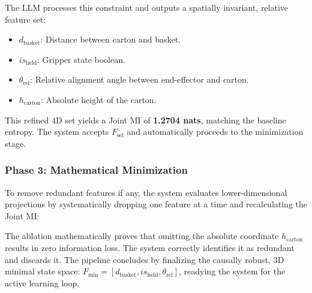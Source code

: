 \documentclass[journal]{IEEEtran}
\begin{document}
The LLM processes this constraint and outputs a spatially invariant, relative feature set:
\begin{itemize}
    \item $d_{\text{basket}}$: Distance between carton and basket.
    \item $is_{\text{held}}$: Gripper state boolean.
    \item $\theta_{\text{rel}}$: Relative alignment angle between end-effector and carton.
    \item $h_{\text{carton}}$: Absolute height of the carton.
\end{itemize}

This refined $4\text{D}$ set yields a Joint MI of \textbf{1.2704 nats}, matching the baseline entropy. The system accepts $F_{\text{sel}}$ and automatically proceeds to the minimization stage.

\subsubsection{Phase 3: Mathematical Minimization}
To remove redundant features if any, the system evaluates lower-dimensional projections by systematically dropping one feature at a time and recalculating the Joint MI:

\vspace{0.5em}
\noindent
{}
\vspace{0.5em}

The ablation mathematically proves that omitting the absolute coordinate $h_{\text{carton}}$ results in zero information loss. The system correctly identifies it as redundant and discards it. The pipeline concludes by finalizing the causally robust, $3\text{D}$ minimal state space: $F_{\text{min}} = [d_{\text{basket}}, is_{\text{held}}, \theta_{\text{rel}}]$, readying the system for the active learning loop.




\end{document}
